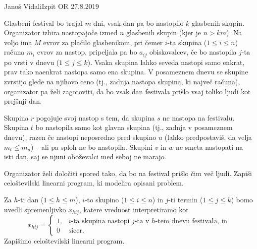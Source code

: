 \begin{naloga}{Janoš Vidali}{Izpit OR 27.8.2019}
\begin{vprasanje}
Glasbeni festival bo trajal $m$ dni,
vsak dan pa bo nastopilo $k$ glasbenih skupin.
Organizator izbira nastopajoče izmed $n$ glasbenih skupin
(kjer je $n > km$).
Na voljo ima $M$ evrov za plačilo glasbenikom,
pri čemer $i$-ta skupina ($1 \le i \le n$)
računa $m_i$ evrov za nastop,
pripeljala pa bo $a_{ij}$ obiskovalcev,
če bo nastopila $j$-ta po vrsti v dnevu ($1 \le j \le k$).
Vsaka skupina lahko seveda nastopi samo enkrat,
prav tako naenkrat nastopa samo ena skupina.
V posameznem dnevu se skupine zvrstijo glede na njihovo ceno
(tj., zadnja nastopa skupina, ki največ računa),
organizator pa želi zagotoviti,
da bo vsak dan festivala prišlo vsaj toliko ljudi kot prejšnji dan.

Skupina $r$ pogojuje svoj nastop s tem,
da skupina $s$ ne nastopa na festivalu.
Skupina $t$ bo nastopila samo kot glavna skupina
(tj., zadnja v posameznem dnevu),
razen če nastopi neposredno pred skupino $u$
(lahko predpostaviš, da velja $m_t \le m_u$)
-- ali pa sploh ne bo nastopila.
Skupini $v$ in $w$ ne smeta nastopati na isti dan,
saj se njuni oboževalci med seboj ne marajo.

Organizator želi določiti spored tako,
da bo na festival prišlo čim več ljudi.
Zapiši celoštevilski linearni program, ki modelira opisani problem.
\end{vprasanje}

\begin{odgovor}
Za $h$-ti dan ($1 \le h \le m$),
$i$-to skupino ($1 \le i \le n$) in $j$-ti termin ($1 \le j \le k$)
bomo uvedli spremenljivko $x_{hij}$,
katere vrednost interpretiramo kot
$$
x_{hij} = \begin{cases}
1, & \text{$i$-ta skupina nastopi $j$-ta v $h$-tem dnevu festivala, in} \\
0  & \text{sicer.}
\end{cases}
$$
Zapišimo celoštevilski linearni program.


\end{odgovor}
\end{naloga}
